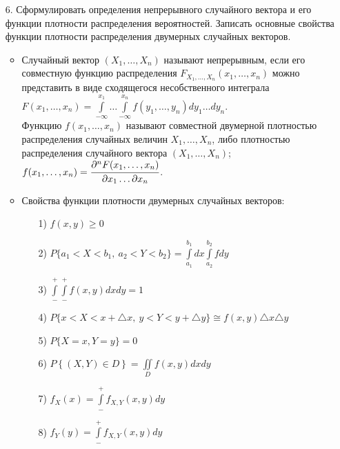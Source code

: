 \documentclass[a4paper]{article}
\begin{document}
\begin{enumerate}
\item[6.] Сформулировать определения непрерывного случайного вектора и его функции плотности распределения вероятностей. Записать основные свойства функции плотности распределения двумерных случайных векторов.
\begin{itemize}
\item Случайный вектор $(X_1, \ldots, X_n)$ называют непрерывным, если его совместную функцию распределения $F_{X_1, \ldots, X_n} (x_1, \ldots, x_n)$ можно представить в виде сходящегося несобственного интеграла $\displaystyle  F(x_1, \ldots, x_n) = \int\limits_{-\infty}^{x_1} \ldots \int\limits_{-\infty}^{x_n} f(y_1, \ldots, y_n) dy_1 \ldots dy_n$. \\
Функцию $f(x_1, \ldots, x_n)$ называют совместной двумерной плотностью распределения случайных величин $X_1, \ldots, X_n$, либо плотностью распределения случайного вектора $(X_1, \ldots, X_n)$; $f(x_1, \ldots, x_n) = \cfrac{\partial^n F(x_1, \ldots, x_n)}{\partial x_1 \ldots \partial x_n}$.
\item Свойства функции плотности двумерных случайных векторов:
	\begin{enumerate}
	\item[1)] $f(x,y) \geqslant 0$
	\item[2)] $\displaystyle  P\{a_1 < X < b_1, \ a_2 < Y < b_2\} = \int\limits_{a_1}^{b_1} dx \int\limits_{a_2}^{b_2} fdy$
	\item[3)] $\displaystyle  \int\limits_{-}^{+} \int\limits_{-}^{+} f(x,y) dxdy = 1$
	\item[4)] $P\{x < X < x + \triangle x, \ y < Y < y + \triangle y\} \cong f(x,y) \triangle x \triangle y$
	\item[5)] $P\{X = x, Y = y\} = 0$
	\item[6)] $\displaystyle  P\left\{(X,Y) \in D \right\} = \iint\limits_{D} f(x,y) dxdy$
	\item[7)] $\displaystyle  f_X(x) = \int\limits_{-}^{+} f_{X,Y} (x,y) dy$
	\item[8)] $\displaystyle  f_Y(y) = \int\limits_{-}^{+} f_{X,Y} (x,y) dy$
	\end{enumerate}
\end{itemize}



\end{enumerate}
\end{document}
